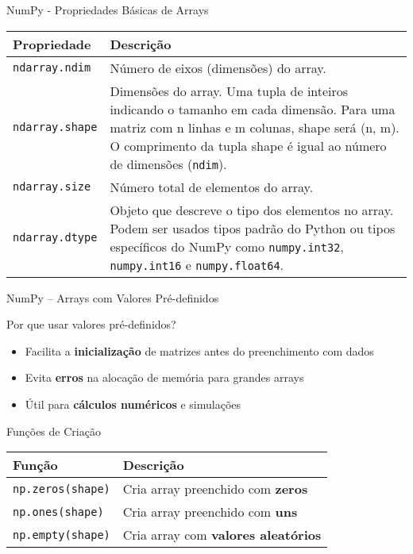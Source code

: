 \begin{frame}{NumPy - Propriedades Básicas de Arrays}

\centering
\begin{tabular}{|l|p{8cm}|}
\hline
\textbf{Propriedade} & \textbf{Descrição} \\
\hline
\texttt{ndarray.ndim} & Número de eixos (dimensões) do array. \\
\hline
\texttt{ndarray.shape} & Dimensões do array. Uma tupla de inteiros indicando o tamanho em cada dimensão. Para uma matriz com n linhas e m colunas, shape será (n, m). O comprimento da tupla shape é igual ao número de dimensões (\texttt{ndim}). \\
\hline
\texttt{ndarray.size} & Número total de elementos do array. \\
\hline
\texttt{ndarray.dtype} & Objeto que descreve o tipo dos elementos no array. Podem ser usados tipos padrão do Python ou tipos específicos do NumPy como \texttt{numpy.int32}, \texttt{numpy.int16} e \texttt{numpy.float64}. \\
\hline
\end{tabular}






\end{frame}


\begin{frame}[fragile]{NumPy – Arrays com Valores Pré-definidos}

\begin{block}{Por que usar valores pré-definidos?}
\begin{itemize}
    \item Facilita a \textbf{inicialização} de matrizes antes do preenchimento com dados
    \item Evita \textbf{erros} na alocação de memória para grandes arrays
    \item Útil para \textbf{cálculos numéricos} e simulações
   
\end{itemize}
\end{block}

\begin{block}{Funções de Criação}
\begin{tabular}{ll}
\textbf{Função} & \textbf{Descrição} \\
\hline
\texttt{np.zeros(shape)} & Cria array preenchido com \textbf{zeros} \\
\texttt{np.ones(shape)} & Cria array preenchido com \textbf{uns} \\
\texttt{np.empty(shape)} & Cria array com \textbf{valores aleatórios}  \\

\end{tabular}
\end{block}

\end{frame}

